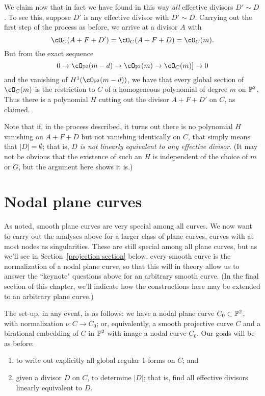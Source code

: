 We claim now that in fact we have found in this way \emph{all} effective divisors $D' \sim D$. To see this, suppose $D'$ is any effective divisor with $D' \sim D$. Carrying out the first step of the process as before, we arrive at a divisor $A$ with 
$$
\cO_C(A+F+D') = \cO_C(A+F+D)  = \cO_C(m).
$$
But from the exact sequence 
$$
0 \to \cO_{\PP^2}(m-d) \to \cO_{\PP^2}(m)  \to \cO_C(m) ]\to 0
$$
and the vanishing of $H^1(\cO_{\PP^2}(m-d))$, we have that every global section of $ \cO_C(m)$ is the restriction to $C$ of a homogeneous polynomial of degree $m$ on $\PP^2$. Thus there is a polynomial $H$ cutting out the divisor $A+F+D'$ on $C$, as claimed.

Note that if, in the process described, it turns out there is no polynomial $H$ vanishing on  $A + F + D$ but not vanishing identically on $C$, that simply means that $|D| = \emptyset$; that is, \emph{$D$ is not linearly equivalent to any effective divisor}. (It may not be obvious that the existence of such an $H$ is independent of the choice of $m$ or $G$, but the argument here shows it is.)

\section{Nodal plane curves}\label{nodal plane curves}

As noted, smooth plane curves are very special among all curves. We now want to carry out the analyses above for a larger class of plane curves, curves with at most nodes as singularities. These are still special among all plane curves, but as we'll see in Section~\ref{projection section} below, every smooth curve is the normalization of a nodal plane curve, so that this will in theory allow us to answer the ``keynote" questions above for an arbitrary smooth curve. (In the final section of this chapter, we'll indicate how the constructions here may be extended to an arbitrary plane curve.)

The set-up, in any event, is as follows: we have a nodal plane curve $C_0 \subset \PP^2$, with normalization $\nu : C \to C_0$; or, equivalently, a smooth projective curve $C$ and a birational embedding of $C$ in $\PP^2$ with image a nodal curve $C_0$. Our goals will be as before: 
\begin{enumerate}
\item to write out explicitly all global regular 1-forms on $C$; and
\item given a divisor $D$ on $C$, to  determine $|D|$; that is, find all effective divisors linearly equivalent to $D$.
\end{enumerate}

